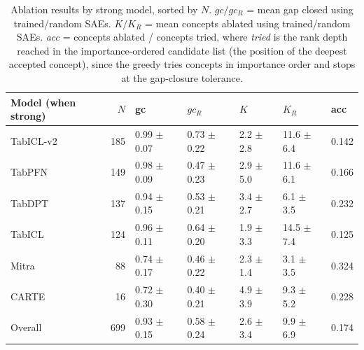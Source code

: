 \begin{table}[h]
\centering
\small
\caption{Ablation results by strong model, sorted by $N$. $gc/gc_R$ = mean gap closed using trained/random SAEs. $K/K_R$ = mean concepts ablated using trained/random SAEs. \emph{acc} = concepts ablated / concepts tried, where \emph{tried} is the rank depth reached in the importance-ordered candidate list (the position of the deepest accepted concept), since the greedy tries concepts in importance order and stops at the gap-closure tolerance.}
\label{tab:ablation_summary}
\begin{tabular}{lrlllll}
\toprule
Model (when strong) & $N$ & gc & $gc_R$ & $K$ & $K_R$ & acc \\
\midrule
TabICL-v2 & 185 & 0.99 $\pm$ 0.07 & 0.73 $\pm$ 0.22 & 2.2 $\pm$ 2.8 & 11.6 $\pm$ 6.4 & 0.142 \\
TabPFN & 149 & 0.98 $\pm$ 0.09 & 0.47 $\pm$ 0.23 & 2.9 $\pm$ 5.0 & 11.6 $\pm$ 6.1 & 0.166 \\
TabDPT & 137 & 0.94 $\pm$ 0.15 & 0.53 $\pm$ 0.21 & 3.4 $\pm$ 2.7 & 6.1 $\pm$ 3.5 & 0.232 \\
TabICL & 124 & 0.96 $\pm$ 0.11 & 0.64 $\pm$ 0.20 & 1.9 $\pm$ 3.3 & 14.5 $\pm$ 7.4 & 0.125 \\
Mitra & 88 & 0.74 $\pm$ 0.17 & 0.46 $\pm$ 0.22 & 2.3 $\pm$ 1.4 & 3.1 $\pm$ 3.5 & 0.324 \\
CARTE & 16 & 0.72 $\pm$ 0.30 & 0.40 $\pm$ 0.21 & 4.9 $\pm$ 3.9 & 9.3 $\pm$ 5.2 & 0.228 \\
\midrule
Overall & 699 & 0.93 $\pm$ 0.15 & 0.58 $\pm$ 0.24 & 2.6 $\pm$ 3.4 & 9.9 $\pm$ 6.9 & 0.174 \\
\bottomrule
\end{tabular}
\end{table}
